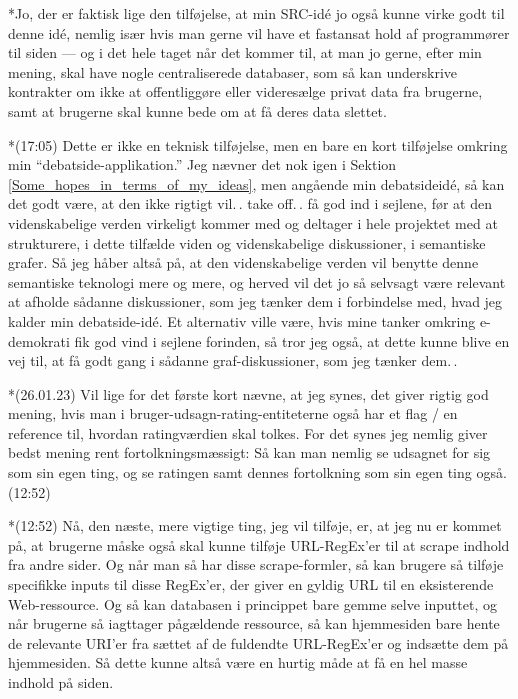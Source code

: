 \documentclass{report}
\begin{document}
*Jo, der er faktisk lige den tilføjelse, at min SRC-idé jo også kunne virke godt til denne idé, nemlig især hvis man gerne vil have et fastansat hold af programmører til siden --- og i det hele taget når det kommer til, at man jo gerne, efter min mening, skal have nogle centraliserede databaser, som så kan underskrive kontrakter om ikke at offentliggøre eller videresælge privat data fra brugerne, samt at brugerne skal kunne bede om at få deres data slettet.

*(17:05) Dette er ikke en teknisk tilføjelse, men en bare en kort tilføjelse omkring min ``debatside-applikation.'' Jeg nævner det nok igen i Sektion \ref{Some_hopes_in_terms_of_my_ideas}, men angående min debatsideidé, så kan det godt være, at den ikke rigtigt vil.\,. take off.\,. få god ind i sejlene, før at den videnskabelige verden virkeligt kommer med og deltager i hele projektet med at strukturere, i dette tilfælde viden og videnskabelige diskussioner, i semantiske grafer. Så jeg håber altså på, at den videnskabelige verden vil benytte denne semantiske teknologi mere og mere, og herved vil det jo så selvsagt være relevant at afholde sådanne diskussioner, som jeg tænker dem i forbindelse med, hvad jeg kalder min debatside-idé. Et alternativ ville være, hvis mine tanker omkring e-demokrati fik god vind i sejlene forinden, så tror jeg også, at dette kunne blive en vej til, at få godt gang i sådanne graf-diskussioner, som jeg tænker dem.\,.

*(26.01.23) Vil lige for det første kort nævne, at jeg synes, det giver rigtig god mening, hvis man i bruger-udsagn-rating-entiteterne også har et flag / en reference til, hvordan ratingværdien skal tolkes. For det synes jeg nemlig giver bedst mening rent fortolkningsmæssigt: Så kan man nemlig se udsagnet for sig som sin egen ting, og se ratingen samt dennes fortolkning som sin egen ting også. (12:52)

*(12:52) Nå, den næste, mere vigtige ting, jeg vil tilføje, er, at jeg nu er kommet på, at brugerne måske også skal kunne tilføje URL-RegEx'er til at scrape indhold fra andre sider. Og når man så har disse scrape-formler, så kan brugere så tilføje specifikke inputs til disse RegEx'er, der giver en gyldig URL til en eksisterende Web-ressource. Og så kan databasen i princippet bare gemme selve inputtet, og når brugerne så iagttager pågældende ressource, så kan hjemmesiden bare hente de relevante URI'er fra sættet af de fuldendte URL-RegEx'er og indsætte dem på hjemmesiden. Så dette kunne altså være en hurtig måde at få en hel masse indhold på siden.
\end{document}
